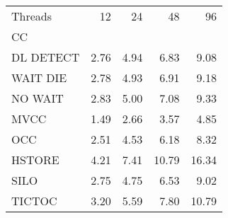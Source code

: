 \begin{tabular}{lrrrr}
\toprule
Threads &   12 &   24 &    48 &    96 \\
CC        &      &      &       &       \\
\midrule
DL DETECT & 2.76 & 4.94 &  6.83 &  9.08 \\
WAIT DIE  & 2.78 & 4.93 &  6.91 &  9.18 \\
NO WAIT   & 2.83 & 5.00 &  7.08 &  9.33 \\
MVCC      & 1.49 & 2.66 &  3.57 &  4.85 \\
OCC       & 2.51 & 4.53 &  6.18 &  8.32 \\
HSTORE    & 4.21 & 7.41 & 10.79 & 16.34 \\
SILO      & 2.75 & 4.75 &  6.53 &  9.02 \\
TICTOC    & 3.20 & 5.59 &  7.80 & 10.79 \\
\bottomrule
\end{tabular}
